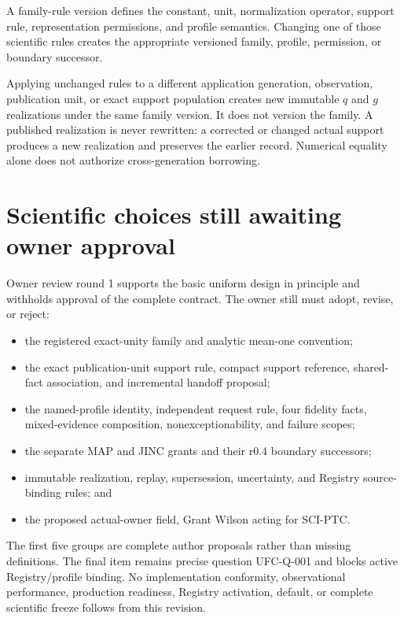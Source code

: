 A family-rule version defines the constant, unit, normalization operator,
support rule, representation permissions, and profile semantics. Changing one
of those scientific rules creates the appropriate versioned family, profile,
permission, or boundary successor.

Applying unchanged rules to a different application generation, observation,
publication unit, or exact support population creates new immutable \(q\) and
\(g\) realizations under the same family version. It does not version the
family. A published realization is never rewritten: a corrected or changed
actual support produces a new realization and preserves the earlier record.
Numerical equality alone does not authorize cross-generation borrowing.

\section{Scientific choices still awaiting owner approval}

Owner review round 1 supports the basic uniform design in principle and
withholds approval of the complete contract. The owner still must adopt,
revise, or reject:

\begin{itemize}
\item the registered exact-unity family and analytic mean-one convention;
\item the exact publication-unit support rule, compact support reference,
shared-fact association, and incremental handoff proposal;
\item the named-profile identity, independent request rule, four fidelity
facts, mixed-evidence composition, nonexceptionability, and failure scopes;
\item the separate MAP and JINC grants and their r0.4 boundary successors;
\item immutable realization, replay, supersession, uncertainty, and Registry
source-binding rules; and
\item the proposed actual-owner field, Grant Wilson acting for SCI-PTC.
\end{itemize}

The first five groups are complete author proposals rather than missing
definitions. The final item remains precise question UFC-Q-001 and blocks
active Registry/profile binding. No implementation conformity, observational
performance, production readiness, Registry activation, default, or complete
scientific freeze follows from this revision.

